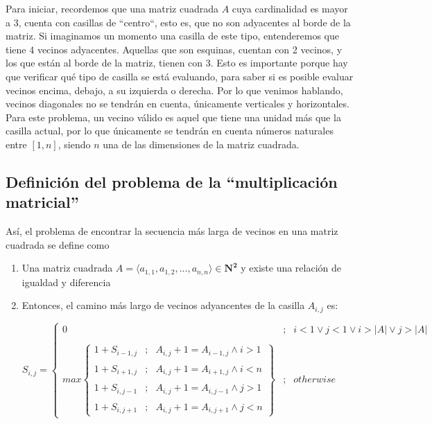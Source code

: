 \documentclass[letter]{article}
\begin{document}
Para iniciar, recordemos que una matriz cuadrada $A$ cuya cardinalidad es mayor a 3, cuenta con casillas de ``centro``, esto es, que no son adyacentes al borde de la matriz. Si imaginamos un momento una casilla de este tipo, entenderemos que tiene 4 vecinos adyacentes. Aquellas que son esquinas, cuentan con 2 vecinos, y los que están al borde de la matriz, tienen con 3. Esto es importante porque hay que verificar qué tipo de casilla se está evaluando, para saber si es posible evaluar vecinos encima, debajo, a su izquierda o derecha.
Por lo que venimos hablando, vecinos diagonales no se tendrán en cuenta, únicamente verticales y horizontales. Para este problema, un vecino válido es aquel que tiene una unidad más que la casilla actual, por lo que únicamente se tendrán en cuenta números naturales entre $[1,n]$, siendo $n$ una de las dimensiones de la matriz cuadrada.

\subsection{Definición del problema de la ``multiplicación matricial''} \label{problema}
Así, el problema de encontrar la secuencia más larga de vecinos en una matriz cuadrada se define como
  \begin{enumerate}
    \item Una matriz cuadrada $A = \langle a_{1,1}, a_{1,2}, ... , a_{n,n}\rangle \in \mathbf{N^2} $ y existe una relación de igualdad y diferencia
    
    \item Entonces, el camino más largo de vecinos adyancentes de la casilla $A_{i,j}$ es: 
    
    \begin{equation}
        S_{i,j}= \left\{ \begin{array}{lcc}
             0 &   ;  & i < 1 \lor j < 1  \lor i > |A| \lor j > |A| \\
             \\ 
             max \left\{
             \begin{array}{lcc}
                  1 + S_{i-1,j}&  ;  & A_{i,j}+1 = A_{i-1,j} \land i>1   \\
                  \\
                 1 + S_{i+1,j}&  ;  & A_{i,j}+1 = A_{i+1,j} \land i<n   \\
                 \\
                  1 + S_{i,j-1}&  ;  & A_{i,j}+1 = A_{i,j-1} \land j>1   \\
                 \\
                 1 + S_{i,j+1}&  ;  & A_{i,j}+1 = A_{i,j+1} \land j<n   
                 
             \end{array}\right\} &  ; & otherwise
             \end{array}
   \right.
    \end{equation}
  \end{enumerate}
\end{document}
